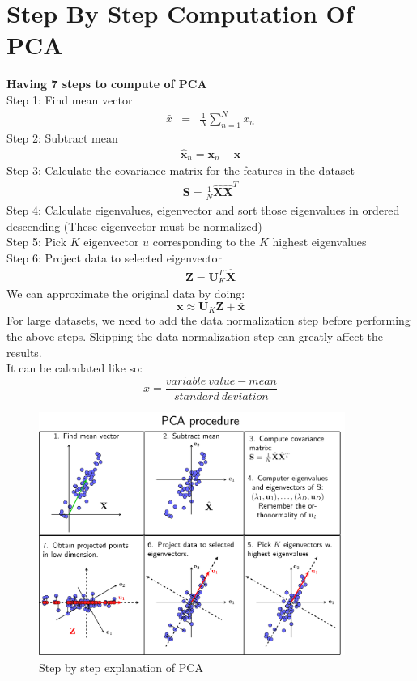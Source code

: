 \documentclass[a4paper, 12pt]{report}
\begin{document}
\section{Step By Step Computation Of PCA}
\textbf{Having 7 steps to compute of PCA}\\
Step 1: Find mean vector
\begin{eqnarray*}
\bar{x} &=& \frac{1}{N}\sum_{n=1}^N x_n
\end{eqnarray*}
Step 2: Subtract mean
\begin{eqnarray*}
\hat{\mathbf{x}}_n = \mathbf{x}_n - \bar{\mathbf{x}}
\end{eqnarray*}
Step 3: Calculate the covariance matrix for the features in the dataset
\begin{eqnarray*}
\mathbf{S} = \frac{1}{N}\hat{\mathbf{X}}\hat{\mathbf{X}}^T
\end{eqnarray*}
Step 4: Calculate eigenvalues, eigenvector and sort those eigenvalues in ordered descending (These eigenvector must be normalized)\\
Step 5:  Pick $K$ eigenvector $u$ corresponding to the $K$ highest eigenvalues\\
Step 6: Project data to selected eigenvector
\begin{eqnarray*}
\mathbf{Z} = \mathbf{U}_K^T\hat{\mathbf{X}}
\end{eqnarray*}
We can approximate the original data by doing:
$$\mathbf{x} \approx \mathbf{U}_K\mathbf{Z} + \bar{\mathbf{x}}$$
For large datasets, we need to add the data normalization step before performing the above steps. Skipping the data normalization step can greatly affect the results. \\
It can be calculated like so:
$$ x = \frac{variable ~ value - mean}{standard ~ deviation}$$
\begin{figure}[H]
    \center
    \includegraphics[width=10cm,height=8cm]{pca_procedure.png}
    \caption{Step by step explanation of PCA}
\end{figure}
\end{document}
